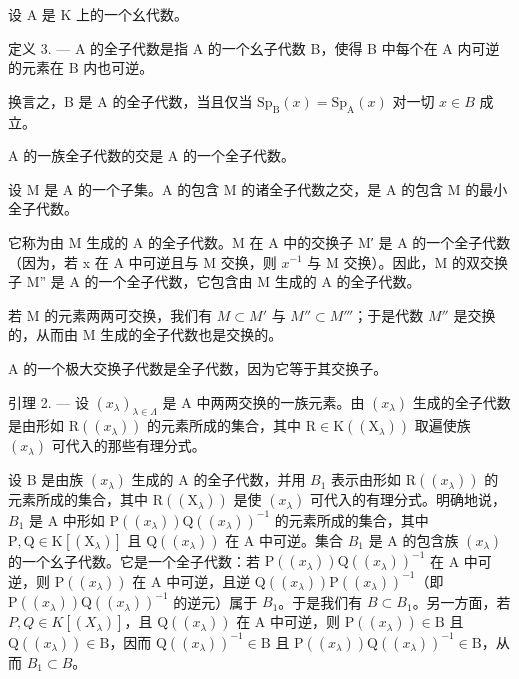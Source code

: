 设 A 是 K 上的一个幺代数。

定义 3. --- A 的全子代数是指 A 的一个幺子代数 B，使得 B 中每个在 A 内可逆的元素在 B 内也可逆。

换言之，B 是 A 的全子代数，当且仅当 \(\mathrm{Sp}_{\mathrm{B}}(x)=\mathrm{Sp}_{\mathrm{A}}(x)\) 对一切 \(x\in B\) 成立。

A 的一族全子代数的交是 A 的一个全子代数。

设 M 是 A 的一个子集。A 的包含 M 的诸全子代数之交，是 A 的包含 M 的最小全子代数。

它称为由 M 生成的 A 的全子代数。M 在 A 中的交换子 M′ 是 A 的一个全子代数（因为，若 x 在 A 中可逆且与 M 交换，则 \(x^{-1}\) 与 M 交换）。因此，M 的双交换子 M'' 是 A 的一个全子代数，它包含由 M 生成的 A 的全子代数。

若 M 的元素两两可交换，我们有 \(M \subset M'\) 与 \(M'' \subset M'''\)；于是代数 \(M''\) 是交换的，从而由 M 生成的全子代数也是交换的。

A 的一个极大交换子代数是全子代数，因为它等于其交换子。

引理 2. --- 设 \((x_{\lambda})_{\lambda \in \Lambda}\) 是 A 中两两交换的一族元素。由 \((x_{\lambda})\) 生成的全子代数是由形如 \(\mathrm{R}((x_{\lambda}))\) 的元素所成的集合，其中 \(\mathrm{R} \in \mathrm{K}((\mathrm{X}_{\lambda}))\) 取遍使族 \((x_{\lambda})\) 可代入的那些有理分式。

设 B 是由族 \((x_{\lambda})\) 生成的 A 的全子代数，并用 \(B_{1}\) 表示由形如 \(\mathrm{R}((x_{\lambda}))\) 的元素所成的集合，其中 \(\mathrm{R}((\mathrm{X}_{\lambda}))\) 是使 \((x_{\lambda})\) 可代入的有理分式。明确地说，\(B_{1}\) 是 A 中形如 \(\mathrm{P}((x_{\lambda}))\mathrm{Q}((x_{\lambda}))^{-1}\) 的元素所成的集合，其中 \(\mathrm{P},\mathrm{Q}\in\mathrm{K}[(\mathrm{X}_{\lambda})]\) 且 \(\mathrm{Q}((x_{\lambda}))\) 在 A 中可逆。集合 \(B_{1}\) 是 A 的包含族 \((x_{\lambda})\) 的一个幺子代数。它是一个全子代数：若 \(\mathrm{P}((x_{\lambda}))\mathrm{Q}((x_{\lambda}))^{-1}\) 在 A 中可逆，则 \(\mathrm{P}((x_{\lambda}))\) 在 A 中可逆，且逆 \(\mathrm{Q}((x_{\lambda}))\mathrm{P}((x_{\lambda}))^{-1}\)（即 \(\mathrm{P}((x_{\lambda}))\mathrm{Q}((x_{\lambda}))^{-1}\) 的逆元）属于 \(B_{1}\)。于是我们有 \(B\subset B_{1}\)。另一方面，若 \(P,Q\in K[(X_{\lambda})]\)，且 \(\mathrm{Q}((x_{\lambda}))\) 在 A 中可逆，则 \(\mathrm{P}((x_{\lambda}))\in\mathrm{B}\) 且 \(\mathrm{Q}((x_{\lambda}))\in\mathrm{B}\)，因而 \(\mathrm{Q}((x_{\lambda}))^{-1}\in\mathrm{B}\) 且 \(\mathrm{P}((x_{\lambda}))\mathrm{Q}((x_{\lambda}))^{-1}\in\mathrm{B}\)，从而 \(B_{1}\subset B\)。

